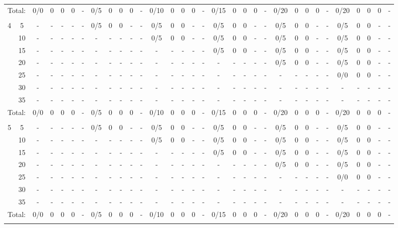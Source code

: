 \documentclass[a1paper]{article}
\begin{document}
\begin{tabular}{cc ccccc|ccccc|ccccc|ccccc|ccccc|ccccc}
\multicolumn{2}{c}{Total:} & 0/0& 0& 0& 0 & - & 0/5& 0& 0& 0 & - & 0/10& 0& 0& 0 & - & 0/15& 0& 0& 0 & - & 0/20& 0& 0& 0 & - & 0/20& 0& 0& 0 & - \\\\
\multirow{7}{*}{4} & 5 & - & - & - & - & - & 0/5 & 0 & 0 & - & - & 0/5 & 0 & 0 & - & - & 0/5 & 0 & 0 & - & - & 0/5 & 0 & 0 & - & - & 0/5 & 0 & 0 & - & -	\\ & 10 & - & - & - & - & -& - & - & - & - & - & 0/5 & 0 & 0 & - & - & 0/5 & 0 & 0 & - & - & 0/5 & 0 & 0 & - & - & 0/5 & 0 & 0 & - & -	\\ & 15 & - & - & - & - & -& - & - & - & - & -& - & - & - & - & - & 0/5 & 0 & 0 & - & - & 0/5 & 0 & 0 & - & - & 0/5 & 0 & 0 & - & -	\\ & 20 & - & - & - & - & -& - & - & - & - & -& - & - & - & - & -& - & - & - & - & - & 0/5 & 0 & 0 & - & - & 0/5 & 0 & 0 & - & -	\\ & 25 & - & - & - & - & -& - & - & - & - & -& - & - & - & - & -& - & - & - & - & -& - & - & - & - & - & 0/0 & 0 & 0 & - & -	\\ & 30 & - & - & - & - & -& - & - & - & - & -& - & - & - & - & -& - & - & - & - & -& - & - & - & - & -& - & - & - & - & -	\\ & 35 & - & - & - & - & -& - & - & - & - & -& - & - & - & - & -& - & - & - & - & -& - & - & - & - & -& - & - & - & - & -	\\\cline{3-32}
\multicolumn{2}{c}{Total:} & 0/0& 0& 0& 0 & - & 0/5& 0& 0& 0 & - & 0/10& 0& 0& 0 & - & 0/15& 0& 0& 0 & - & 0/20& 0& 0& 0 & - & 0/20& 0& 0& 0 & - \\\\
\multirow{7}{*}{5} & 5 & - & - & - & - & - & 0/5 & 0 & 0 & - & - & 0/5 & 0 & 0 & - & - & 0/5 & 0 & 0 & - & - & 0/5 & 0 & 0 & - & - & 0/5 & 0 & 0 & - & -	\\ & 10 & - & - & - & - & -& - & - & - & - & - & 0/5 & 0 & 0 & - & - & 0/5 & 0 & 0 & - & - & 0/5 & 0 & 0 & - & - & 0/5 & 0 & 0 & - & -	\\ & 15 & - & - & - & - & -& - & - & - & - & -& - & - & - & - & - & 0/5 & 0 & 0 & - & - & 0/5 & 0 & 0 & - & - & 0/5 & 0 & 0 & - & -	\\ & 20 & - & - & - & - & -& - & - & - & - & -& - & - & - & - & -& - & - & - & - & - & 0/5 & 0 & 0 & - & - & 0/5 & 0 & 0 & - & -	\\ & 25 & - & - & - & - & -& - & - & - & - & -& - & - & - & - & -& - & - & - & - & -& - & - & - & - & - & 0/0 & 0 & 0 & - & -	\\ & 30 & - & - & - & - & -& - & - & - & - & -& - & - & - & - & -& - & - & - & - & -& - & - & - & - & -& - & - & - & - & -	\\ & 35 & - & - & - & - & -& - & - & - & - & -& - & - & - & - & -& - & - & - & - & -& - & - & - & - & -& - & - & - & - & -	\\\cline{3-32}
\multicolumn{2}{c}{Total:} & 0/0& 0& 0& 0 & - & 0/5& 0& 0& 0 & - & 0/10& 0& 0& 0 & - & 0/15& 0& 0& 0 & - & 0/20& 0& 0& 0 & - & 0/20& 0& 0& 0 & - \\\\
\end{tabular}
\pagebreak
\end{document}
